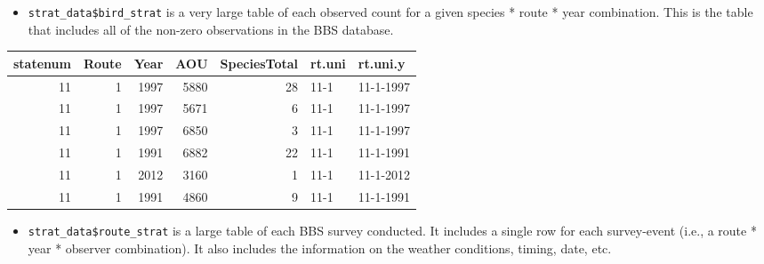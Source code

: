 \documentclass[
]{book}
\newenvironment{Shaded}{\begin{snugshade}}{\end{snugshade}}
\newcommand{\DecValTok}[1]{\textcolor[rgb]{0.00,0.00,0.81}{#1}}
\newcommand{\FunctionTok}[1]{\textcolor[rgb]{0.00,0.00,0.00}{#1}}
\newcommand{\NormalTok}[1]{#1}
\newcommand{\SpecialCharTok}[1]{\textcolor[rgb]{0.00,0.00,0.00}{#1}}
\providecommand{\tightlist}{%
  \setlength{\itemsep}{0pt}\setlength{\parskip}{0pt}}
\begin{document}
\begin{itemize}
\tightlist
\item
  \texttt{strat\_data\$bird\_strat} is a very large table of each observed count for a given species * route * year combination. This is the table that includes all of the non-zero observations in the BBS database.
\end{itemize}

\begin{Shaded}
\end{Shaded}

\begin{tabular}{r|r|r|r|r|l|l}
\hline
statenum & Route & Year & AOU & SpeciesTotal & rt.uni & rt.uni.y\\
\hline
11 & 1 & 1997 & 5880 & 28 & 11-1 & 11-1-1997\\
\hline
11 & 1 & 1997 & 5671 & 6 & 11-1 & 11-1-1997\\
\hline
11 & 1 & 1997 & 6850 & 3 & 11-1 & 11-1-1997\\
\hline
11 & 1 & 1991 & 6882 & 22 & 11-1 & 11-1-1991\\
\hline
11 & 1 & 2012 & 3160 & 1 & 11-1 & 11-1-2012\\
\hline
11 & 1 & 1991 & 4860 & 9 & 11-1 & 11-1-1991\\
\hline
\end{tabular}

\begin{itemize}
\tightlist
\item
  \texttt{strat\_data\$route\_strat} is a large table of each BBS survey conducted. It includes a single row for each survey-event (i.e., a route * year * observer combination). It also includes the information on the weather conditions, timing, date, etc.
\end{itemize}

\begin{Shaded}
\end{Shaded}
\end{document}
